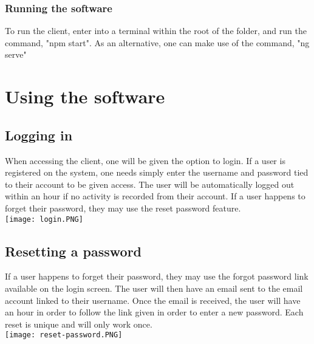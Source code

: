 \documentclass[a4paper,12pt]{article}
\begin{document}
     		\subsubsection {Running the software}
     		
	     	To run the client, enter into a terminal within the root of the folder, and run the command, "npm start". As an alternative, one can make use of the command, "ng serve"
    
    \pagebreak
    
    \section{Using the software}
    
    	\subsection{Logging in}
    	
    	When accessing the client, one will be given the option to login. If a user is registered on the system, one needs simply enter the username and password tied to their account to be given access. The user will be automatically logged out within an hour if no activity is recorded from their account. If a user happens to forget their password, they may use the reset password feature.\\[1.0cm]
        
        \texttt{[image: login.PNG]}\\[1.0cm] 
    	
   		\subsection{Resetting a password}
    	
    	If a user happens to forget their password, they may use the forgot password link available on the login screen. The user will then have an email sent to the email account linked to their username. Once the email is received, the user will have an hour in order to follow the link given in order to enter a new password. Each reset is unique and will only work once.\\[1.0cm]
        
         \texttt{[image: reset-password.PNG]}\\[1.0cm] 
    	
\end{document}
